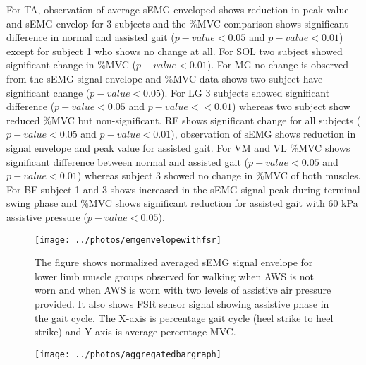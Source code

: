 \documentclass[letterpaper, 10 pt, conference]{ieeeconf}  %
\begin{document}
For TA, observation of average sEMG enveloped shows reduction in peak value and sEMG envelop for 3 subjects and the \%MVC comparison shows significant difference in normal and assisted gait ($p-value < 0.05$ and $p-value < 0.01$) except for subject 1 who shows no change at all. For SOL two subject showed significant change in \%MVC ($p-value < 0.01$). For MG no change is observed from the sEMG signal envelope and \%MVC data shows two subject have significant change ($p-value < 0.05$). For LG 3 subjects showed significant difference ($p-value < 0.05$ and $p-value < <0.01$) whereas two subject show reduced \%MVC but non-significant. RF shows significant change for all subjects ($p-value < 0.05$ and $p-value < 0.01$), observation of sEMG shows reduction in signal envelope and peak value for assisted gait. For VM and VL \%MVC shows significant difference between normal and assisted gait ($p-value < 0.05$ and $p-value < 0.01$) whereas subject 3 showed no change in \%MVC of both muscles. For BF subject 1 and 3 shows increased in the sEMG signal peak during terminal swing phase and \%MVC shows significant reduction for assisted gait with 60 kPa assistive pressure ($p-value < 0.05$).

\begin{figure*}
	\centering
	\texttt{[image: ../photos/emgenvelopewithfsr]}
	\caption{The figure shows normalized averaged sEMG signal envelope for lower limb muscle groups observed for walking when AWS is not worn and when AWS is worn with two levels of assistive air pressure provided. It also shows FSR sensor signal showing assistive phase in the gait cycle. The X-axis is percentage gait cycle (heel strike to heel strike) and Y-axis is average percentage MVC.}
	\label{fig:emgenvelope}
\end{figure*}

\begin{figure*}
	\centering
	\texttt{[image: ../photos/aggregatedbargraph]}
	\caption{}
	\label{fig:aggregatedbargraph}
\end{figure*}
\end{document}
